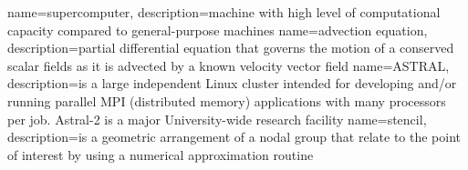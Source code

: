 
{
	name={supercomputer},
	description={machine with high level of computational capacity compared to general-purpose machines}
}
{
	name={advection equation},
	description={partial differential equation that governs the motion of a conserved scalar fields as it is advected by a known velocity vector field \cite{bib:advection}}
}
{
	name={ASTRAL},
	description={is a large independent Linux cluster intended for developing and/or running parallel \gls{MPI} (distributed memory) applications with many processors per job. Astral-2 is a major University-wide research facility \cite{bib:astral}}
}
{
	name={stencil},
	description={is a geometric arrangement of a nodal group that relate to the point of interest by using a numerical approximation routine \cite{bib:stencil}}
}